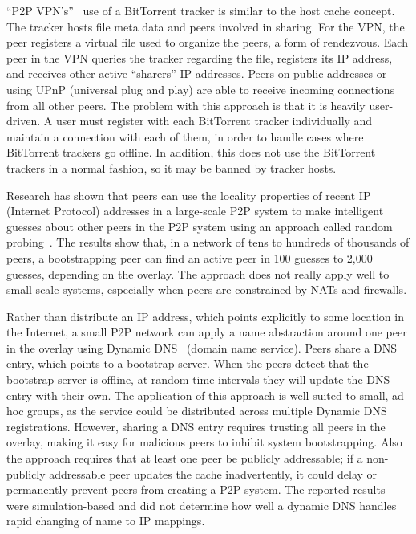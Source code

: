 ``P2P VPN's''~\cite{p2pvpn} use of a BitTorrent tracker is similar to the host
cache concept.  The tracker hosts file meta data and peers involved in sharing.
For the VPN, the peer registers a virtual file used to organize the peers, a
form of rendezvous.  Each peer in the VPN queries the tracker regarding the
file, registers its IP address, and receives other active ``sharers'' IP
addresses.  Peers on public addresses or using UPnP (universal plug and play)
are able to receive incoming connections from all other peers.  The problem
with this approach is that it is heavily user-driven.  A user must register
with each BitTorrent tracker individually and maintain a connection with each
of them, in order to handle cases where BitTorrent trackers go offline.  In
addition, this does not use the BitTorrent trackers in a normal fashion, so it
may be banned by tracker hosts.

Research has shown that peers can use the locality properties of recent IP
(Internet Protocol) addresses in a large-scale P2P system to make intelligent
guesses about other peers in the P2P system using an approach called random
probing~\cite{bootstrapping_p2p, locality_aware}.  The results show that, in a
network of tens to hundreds of thousands of peers, a bootstrapping peer can
find an active peer in 100 guesses to 2,000 guesses, depending on the overlay.
The approach does not really apply well to small-scale systems, especially when
peers are constrained by NATs and firewalls.

Rather than distribute an IP address, which points explicitly to some location
in the Internet, a small P2P network can apply a name abstraction around one
peer in the overlay using Dynamic DNS~\cite{bootstrapping_ddns} (domain name
service).  Peers share a DNS entry, which points to a bootstrap server.  When
the peers detect that the bootstrap server is offline, at random time intervals
they will update the DNS entry with their own.  The application of this
approach is well-suited to small, ad-hoc groups, as the service could be
distributed across multiple Dynamic DNS registrations.  However, sharing a DNS
entry requires trusting all peers in the overlay, making it easy for malicious
peers to inhibit system bootstrapping.  Also the approach requires that at
least one peer be publicly addressable; if a non-publicly addressable peer
updates the cache inadvertently, it could delay or permanently prevent peers
from creating a P2P system.  The reported results~\cite{bootstrapping_ddns}
were simulation-based and did not determine how well a dynamic DNS handles
rapid changing of name to IP mappings.

